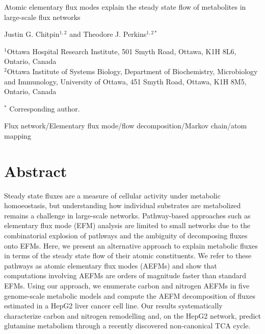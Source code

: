 \documentclass[12pt]{article}
\begin{document}
\begin{titlepage}
    \begin{center}
        \vspace*{1cm}

        {\Large Atomic elementary flux modes explain the steady state flow of
        metabolites in large-scale flux networks}

            
        \vspace{1.0cm}

        Justin G. Chitpin$^{1,2}$ and Theodore J. Perkins$^{1,2*}$

        \vspace{1.0cm}

        $^1$Ottawa Hospital Research Institute, 501 Smyth Road, Ottawa, K1H 8L6, Ontario, Canada\\
        $^2$Ottawa Institute of Systems Biology, Department of Biochemistry, Microbiology and Immunology, University of Ottawa, 451 Smyth Road, Ottawa, K1H 8M5, Ontario, Canada
           
        \vspace{0.5cm}

        $^*$ Corresponding author.

        \vspace{1.0cm}
     
        Flux network/Elementary flux mode/flow decomposition/Markov chain/atom mapping
            
   \end{center}
\end{titlepage}

\clearpage

\section*{Abstract} %

Steady state fluxes are a measure of cellular activity under metabolic
homoeostasis, but understanding how individual substrates are metabolized
remains a challenge in large-scale networks. Pathway-based approaches such
as elementary flux mode (EFM) analysis are limited to small networks due
to the combinatorial explosion of pathways and the ambiguity of
decomposing fluxes onto EFMs. Here, we present an alternative approach to
explain metabolic fluxes in terms of the steady state flow of their atomic
constituents. We refer to these pathways as atomic elementary flux modes
(AEFMs) and show that computations involving AEFMs are orders of magnitude
faster than standard EFMs. Using our approach, we enumerate carbon and
nitrogen AEFMs in five genome-scale metabolic models and compute the AEFM
decomposition of fluxes estimated in a HepG2 liver cancer cell line. Our
results systematically characterize carbon and nitrogen remodelling and,
on the HepG2 network, predict glutamine metabolism through a recently
discovered non-canonical TCA cycle.
\end{document}
